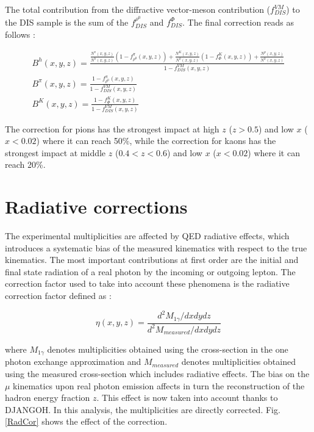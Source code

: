 The total contribution from the diffractive vector-meson contribution ($f^{VM}_{DIS}$) to the DIS sample is the sum of the $f^{\rho^0}_{DIS}$ and $f^{\Phi}_{DIS}$. The final correction reads as follows :

\begin{equation}
  \begin{split}
  B^h(x,y,z) = \frac{ \frac{N^{\pi}(x,y,z)}{N^h(x,y,z)}\left (1-f^{\pi}_{\rho^0}(x,y,z)\right )
                   + \frac{N^K(x,y,z)}{N^h(x,y,z)}\left (1-f^{K}_{\Phi}(x,y,z)\right ) + \frac{N^p(x,y,z)}{N^h(x,y,z)} }{1-f^{VM}_{DIS}(x,y,z)} \\
  B^{\pi}(x,y,z) = \frac{1-f^{\pi}_{\rho^0}(x,y,z)}{1-f^{VM}_{DIS}(x,y,z)} \\
  B^K(x,y,z) = \frac{1-f^{K}_{\Phi}(x,y,z)}{1-f^{VM}_{DIS}(x,y,z)}
  \end{split}
\end{equation}

The correction for pions has the strongest impact at high $z$ ($z>0.5$) and low $x$ ($x<0.02$) where it can reach 50\%, while the correction for kaons has the strongest impact at middle $z$ ($0.4<z<0.6$) and low $x$ ($x<0.02$) where it can reach 20\%.

\section{Radiative corrections}

The experimental multiplicities are affected by QED radiative effects, which introduces a systematic bias of the measured kinematics with respect to the true kinematics. The most important contributions at first order are the initial and final state radiation of a real photon by the incoming or outgoing lepton. The correction factor used to take into account these phenomena is the radiative correction factor defined as :

\begin{equation}
	\eta(x,y,z) = \frac{d^2 M_{1\gamma}/dxdydz}{d^2 M_{measured}/dxdydz}
\end{equation}

where $M_{1\gamma}$ denotes multiplicities obtained using the cross-section in the one photon exchange approximation and $M_{measured}$ denotes multiplicities obtained using the measured cross-section which includes radiative effects. The bias on the $\mu$ kinematics upon real photon emission affects in turn the reconstruction of the hadron energy fraction $z$. This effect is now taken into account thanks to DJANGOH. In this analysis, the multiplicities are directly corrected. Fig.\ref{RadCor} shows the effect of the correction.


